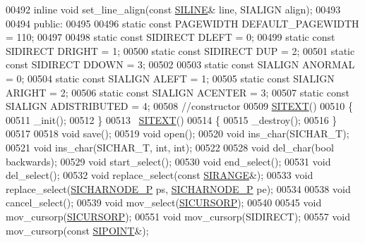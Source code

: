 \begin{DoxyCode}
00492     \textcolor{keyword}{inline} \textcolor{keywordtype}{void} set\_line\_align(\textcolor{keyword}{const} \hyperlink{struct_s_i_r_a_n_g_e}{SILINE}& line, SIALIGN align);    
00493 
00494 \textcolor{keyword}{public}:
00495 
00496     \textcolor{keyword}{static} \textcolor{keyword}{const} PAGEWIDTH DEFAULT\_PAGEWIDTH = 110;
00497 
00498     \textcolor{keyword}{static} \textcolor{keyword}{const} SIDIRECT DLEFT = 0;
00499     \textcolor{keyword}{static} \textcolor{keyword}{const} SIDIRECT DRIGHT = 1;
00500     \textcolor{keyword}{static} \textcolor{keyword}{const} SIDIRECT DUP = 2;
00501     \textcolor{keyword}{static} \textcolor{keyword}{const} SIDIRECT DDOWN = 3;
00502 
00503     \textcolor{keyword}{static} \textcolor{keyword}{const} SIALIGN ANORMAL = 0;
00504     \textcolor{keyword}{static} \textcolor{keyword}{const} SIALIGN ALEFT = 1;
00505     \textcolor{keyword}{static} \textcolor{keyword}{const} SIALIGN ARIGHT = 2;
00506     \textcolor{keyword}{static} \textcolor{keyword}{const} SIALIGN ACENTER = 3;
00507     \textcolor{keyword}{static} \textcolor{keyword}{const} SIALIGN ADISTRIBUTED = 4;
00508     \textcolor{comment}{//constructor}
00509     \hyperlink{class_s_i_t_e_x_t}{SITEXT}()  
00510     \{
00511         \_init();
00512     \}
00513     ~\hyperlink{class_s_i_t_e_x_t}{SITEXT}() 
00514     \{
00515         \_destroy();
00516     \}
00517     
00518     \textcolor{keywordtype}{void} save();    
00519     \textcolor{keywordtype}{void} open();    
00520     \textcolor{keywordtype}{void} ins\_char(SICHAR\_T);    
00521     \textcolor{keywordtype}{void} ins\_char(SICHAR\_T, \textcolor{keywordtype}{int}, \textcolor{keywordtype}{int});  
00522 
00528     \textcolor{keywordtype}{void} del\_char(\textcolor{keywordtype}{bool} backwards);
00529     \textcolor{keywordtype}{void} start\_select();    
00530     \textcolor{keywordtype}{void} end\_select();  
00531     \textcolor{keywordtype}{void} del\_select();  
00532     \textcolor{keywordtype}{void} replace\_select(\textcolor{keyword}{const} \hyperlink{struct_s_i_r_a_n_g_e}{SIRANGE}&); 
00533     \textcolor{keywordtype}{void} replace\_select(\hyperlink{class_s_i_c_h_a_r_n_o_d_e}{SICHARNODE\_P} ps, \hyperlink{class_s_i_c_h_a_r_n_o_d_e}{SICHARNODE\_P} pe);  
00534 
00538     \textcolor{keywordtype}{void} cancel\_select();
00539     \textcolor{keywordtype}{void} mov\_select(\hyperlink{class_s_i_c_h_a_r_n_o_d_e}{SICURSORP});    
00540 
00545     \textcolor{keywordtype}{void} mov\_cursorp(\hyperlink{class_s_i_c_h_a_r_n_o_d_e}{SICURSORP});   
00551     \textcolor{keywordtype}{void} mov\_cursorp(SIDIRECT);
00557     \textcolor{keywordtype}{void} mov\_cursorp(\textcolor{keyword}{const} \hyperlink{struct_s_i_p_o_i_n_t}{SIPOINT}&);

\end{DoxyCode}

